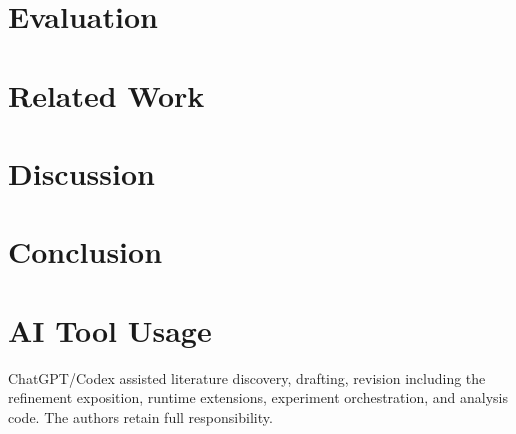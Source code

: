 \documentclass[conference,10pt]{IEEEtran}
\begin{document}
\section{Evaluation}\label{sec:eval}

\section{Related Work}\label{sec:related}

\section{Discussion}\label{sec:discussion}

\section{Conclusion}\label{sec:conclusion}

\section*{AI Tool Usage}
ChatGPT/Codex assisted literature discovery, drafting, revision
including the refinement exposition, runtime extensions, experiment
orchestration, and analysis code. The authors retain full responsibility.
\clearpage


\end{document}
